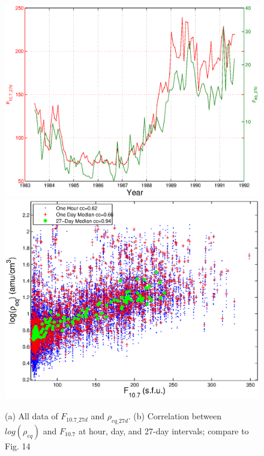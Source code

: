\documentclass[10pt,twocolumn]{article}
\begin{document}
\begin{figure}[htp!]
\centering
\subcaptionbox{\label{ccplot:a}}
{\includegraphics[scale=0.42]{paperfigures/F107MDAllData.eps}}
\subcaptionbox{\label{ccplot:b}}
{\includegraphics[scale=0.42]{paperfigures/ccplot.eps}}
\caption{(a) All data of $F_{10.7\_27d}$ and $\rho_{eq\_27d}$. (b) Correlation between $log(\rho_{eq})$ and $F_{10.7}$ at hour, day, and 27-day intervals; compare to \cite{Takahashi2010} Fig. 14}
\label{ccplot}
\end{figure}
\clearpage
\end{document}
